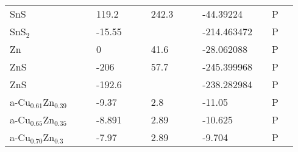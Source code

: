 \begin{landscape}
\begin{center}
\begin{longtable}{|l|p{2.5cm}|l|p{2.5cm}|l|l|p{2.5cm}|l|l|p{2.5cm}|l|l|l|}
SnS                &                            &                   & 119.2               &     & \citep{WagmanDonaldD1969}                    & 242.3              &     & \citep{Hellwege1984}                         & -44.39224                           &     &    P               \\
SnS$_2$              &                            &                   & -15.55              &     &                                              &                    &     &                                              & -214.463472                         &     &     P              \\
Zn                 &                            &                   & 0                   &     & \citep{Haynes2013}                           & 41.6               &     & \citep{Haynes2013}                           & -28.062088                          &     &   P                \\
ZnS                &                            &                   & -206                &     & \citep{Haynes2013}                           & 57.7               &     & \citep{Haynes2013}                           & -245.399968                         &     &   P                \\
ZnS                &                            &                   & -192.6              &     & \citep{Haynes2013}                           &                    &     &                                              & -238.282984                         &     &    P               \\
a-Cu$_{0.61}$Zn$_{0.39}$     &                            &                   & -9.37               &     & \citep{KubaschewskiCatterallJohnAshley.1956} & 2.8                &     & \citep{KubaschewskiCatterallJohnAshley.1956} & -11.05                              &     & P                 \\
a-Cu$_{0.65}$Zn$_{0.35}$     &                            &                   & -8.891              &     & \citep{KubaschewskiCatterallJohnAshley.1956} & 2.89               &     & \citep{KubaschewskiCatterallJohnAshley.1956} & -10.625                             &     & P                 \\
a-Cu$_{0.70}$Zn$_{0.3}$      &                            &                   & -7.97               &     & \citep{KubaschewskiCatterallJohnAshley.1956} & 2.89               &     & \citep{KubaschewskiCatterallJohnAshley.1956} & -9.704                              &     & P                 \\

\end{longtable}
\end{center}
\end{landscape}
